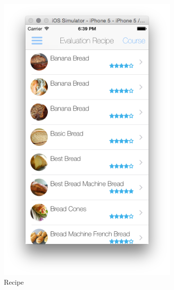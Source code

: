 	  \begin{figure}[h]
	  	\begin{subfigure}{.32\textwidth}
	  		\includegraphics[width=.9\linewidth]{figures/ch4_app_screen_shots/test_system/evaluation_recipe}
	  		\caption{Recipe}
	  	\end{subfigure}
	  	\begin{subfigure}{.32\textwidth}

\end{subfigure}
\end{figure}
